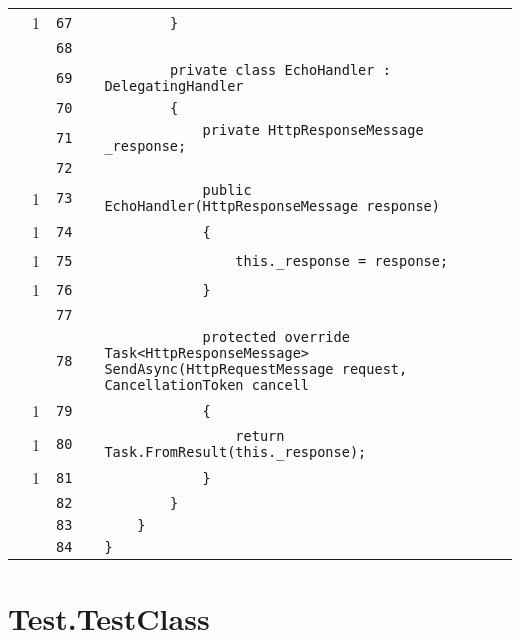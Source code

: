 \documentclass[a4paper,landscape,10pt]{article}
\begin{document}
\begin{longtable}[l]{lrrll}
\cellcolor{green} & 1 & \verb~67~ & & \verb~        }~\\
\cellcolor{gray} &  & \verb~68~ & & \verb~~\\
\cellcolor{gray} &  & \verb~69~ & & \verb~        private class EchoHandler : DelegatingHandler~\\
\cellcolor{gray} &  & \verb~70~ & & \verb~        {~\\
\cellcolor{gray} &  & \verb~71~ & & \verb~            private HttpResponseMessage _response;~\\
\cellcolor{gray} &  & \verb~72~ & & \verb~~\\
\cellcolor{green} & 1 & \verb~73~ & & \verb~            public EchoHandler(HttpResponseMessage response)~\\
\cellcolor{green} & 1 & \verb~74~ & & \verb~            {~\\
\cellcolor{green} & 1 & \verb~75~ & & \verb~                this._response = response;~\\
\cellcolor{green} & 1 & \verb~76~ & & \verb~            }~\\
\cellcolor{gray} &  & \verb~77~ & & \verb~~\\
\cellcolor{gray} &  & \verb~78~ & & \verb~            protected override Task<HttpResponseMessage> SendAsync(HttpRequestMessage request, CancellationToken cancell~\\
\cellcolor{green} & 1 & \verb~79~ & & \verb~            {~\\
\cellcolor{green} & 1 & \verb~80~ & & \verb~                return Task.FromResult(this._response);~\\
\cellcolor{green} & 1 & \verb~81~ & & \verb~            }~\\
\cellcolor{gray} &  & \verb~82~ & & \verb~        }~\\
\cellcolor{gray} &  & \verb~83~ & & \verb~    }~\\
\cellcolor{gray} &  & \verb~84~ & & \verb~}~\\
\end{longtable}
\newpage
\section{Test.TestClass}
\end{document}
